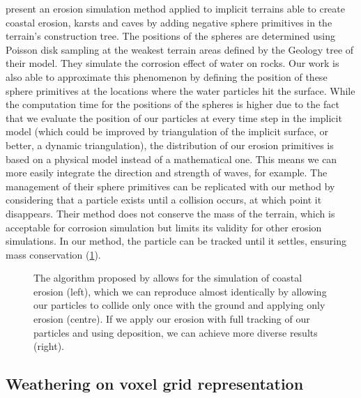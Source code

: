 \citep{Paris2019b} present an erosion simulation method applied to implicit terrains able to create coastal erosion, karsts and caves by adding negative sphere primitives in the terrain's construction tree. The positions of the spheres are determined using Poisson disk sampling at the weakest terrain areas defined by the Geology tree of their model. They simulate the corrosion effect of water on rocks. Our work is also able to approximate this phenomenon by defining the position of these sphere primitives at the locations where the water particles hit the surface. While the computation time for the positions of the spheres is higher due to the fact that we evaluate the position of our particles at every time step in the implicit model (which could be improved by triangulation of the implicit surface, or better, a dynamic triangulation), the distribution of our erosion primitives is based on a physical model instead of a mathematical one. This means we can more easily integrate the direction and strength of waves, for example. The management of their sphere primitives can be replicated with our method by considering that a particle exists until a collision occurs, at which point it disappears. Their method does not conserve the mass of the terrain, which is acceptable for corrosion simulation but limits its validity for other erosion simulations. In our method, the particle can be tracked until it settles, ensuring mass conservation (\cref{fig:erosion-screen-paris2019-1}).

\begin{figure}
    \centering
    \caption{The algorithm proposed by \cite{Paris2019b} allows for the simulation of coastal erosion (left), which we can reproduce almost identically by allowing our particles to collide only once with the ground and applying only erosion (centre). If we apply our erosion with full tracking of our particles and using deposition, we can achieve more diverse results (right).}
    \label{fig:erosion-screen-paris2019-1}
\end{figure}

\subsection{Weathering on voxel grid representation}

